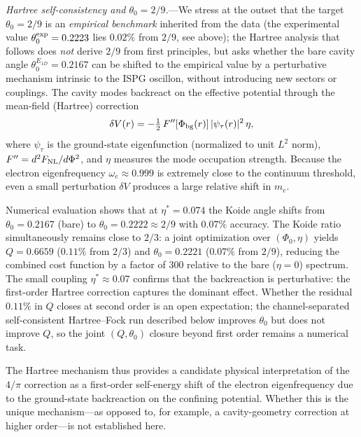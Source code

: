 \documentclass[aps,prd,onecolumn,superscriptaddress,nofootinbib,showpacs,12pt,notitlepage]{revtex4-2}
\begin{document}
\textit{Hartree self-consistency and $\theta_0 = 2/9$.}---We stress
at the outset that the target $\theta_0 = 2/9$ is an
\emph{empirical benchmark} inherited from the data (the experimental
value $\theta_0^{\rm exp} = 0.2223$ lies $0.02\%$ from $2/9$, see
above); the Hartree analysis that follows does \emph{not} derive
$2/9$ from first principles, but asks whether the bare cavity angle
$\theta_0^{E_{1D}} = 0.2167$ can be shifted to the empirical value by
a perturbative mechanism intrinsic to the ISPG oscillon, without
introducing new sectors or couplings. The
cavity modes backreact on the effective potential through the
mean-field (Hartree) correction
\begin{equation}\label{eq:hartree}
  \delta V(r) = -\tfrac{1}{2}\,
    F''[\Phi_{\rm bg}(r)]\,|\psi_\tau(r)|^{2}\,\eta,
\end{equation}
where $\psi_\tau$ is the ground-state eigenfunction (normalized
to unit $L^{2}$ norm), $F'' = d^{2}F_{\rm NL}/d\Phi^{2}$,
and $\eta$ measures the mode occupation strength.
Because the electron eigenfrequency
$\omega_e \approx 0.999$ is extremely close to the continuum
threshold, even a small perturbation $\delta V$ produces a
large relative shift in $m_e$.

Numerical evaluation shows that at $\eta^{*} = 0.074$ the
Koide angle shifts from $\theta_{0} = 0.2167$ (bare) to
$\theta_{0} = 0.2222 \approx 2/9$ with $0.07\%$ accuracy.
The Koide ratio simultaneously remains close to $2/3$: a
joint optimization over $(\Phi_{0}, \eta)$ yields
$Q = 0.6659$ ($0.11\%$ from $2/3$) and
$\theta_{0} = 0.2221$ ($0.07\%$ from $2/9$), reducing the
combined cost function by a factor of $300$ relative to the
bare ($\eta = 0$) spectrum.  The small coupling
$\eta^{*} \approx 0.07$ confirms that the backreaction is
perturbative: the first-order Hartree correction captures the
dominant effect.  Whether the residual $0.11\%$ in $Q$
closes at second order is an open expectation; the
channel-separated self-consistent Hartree--Fock run
described below improves $\theta_0$ but does not improve
$Q$, so the joint $(Q,\theta_0)$ closure beyond first
order remains a numerical task.

The Hartree mechanism thus provides a candidate physical
interpretation of the $4/\pi$ correction as a first-order
self-energy shift of the electron eigenfrequency due to the
ground-state backreaction on the confining potential.  Whether
this is the unique mechanism---as opposed to, for example, a
cavity-geometry correction at higher order---is not
established here.
\end{document}
